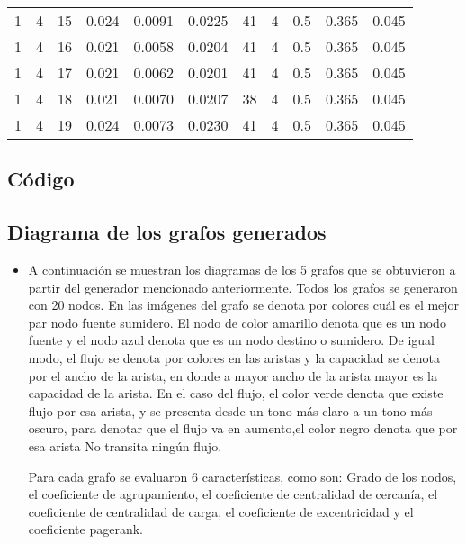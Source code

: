 \documentclass{article}
\begin{document}
\begin{table}[htbp]
{\begin{tabular}{rrrrrrrrrrr}
    1     & 4     & 15    & 0.024 & 0.0091 & 0.0225 & 41    & 4     & 0.5   & 0.365 & 0.045       \\
    1     & 4     & 16    & 0.021 & 0.0058 & 0.0204 & 41    & 4     & 0.5   & 0.365 & 0.045       \\
    1     & 4     & 17    & 0.021 & 0.0062 & 0.0201 & 41    & 4     & 0.5   & 0.365 & 0.045       \\
    1     & 4     & 18    & 0.021 & 0.0070 & 0.0207 & 38    & 4     & 0.5   & 0.365 & 0.045       \\
    1     & 4     & 19    & 0.024 & 0.0073 & 0.0230 & 41    & 4     & 0.5   & 0.365 & 0.045       \\  
    \hline
    \bottomrule
    \end{tabular}%
    }
  \label{tab:addlabel}%
\end{table}%


\subsection{Código}

%

\subsection{Diagrama de los grafos generados}
\begin{itemize}
 
  \item A continuación se muestran los diagramas de los 5 grafos que se obtuvieron a partir del generador mencionado anteriormente. Todos los grafos se generaron con 20 nodos. En las imágenes del grafo se denota por colores cuál es el mejor par nodo fuente sumidero. El nodo de color amarillo denota que es un nodo fuente y el nodo azul denota que es un nodo destino o sumidero. De igual modo, el flujo se denota por colores en las aristas y la capacidad se denota por el ancho de la arista, en donde a mayor ancho de la arista mayor es la capacidad de la arista. En el caso del flujo, el color verde denota que existe flujo por esa arista, y se presenta desde un tono más claro a un tono más oscuro, para denotar que el flujo va en aumento,el color negro denota que por esa arista No transita ningún flujo.  
  
  Para cada grafo se evaluaron 6 características, como son: Grado de los nodos, el coeficiente de agrupamiento, el coeficiente de centralidad de cercanía, el coeficiente de centralidad de carga, el coeficiente de excentricidad y el coeficiente pagerank. 
\end{itemize}
\end{document}
